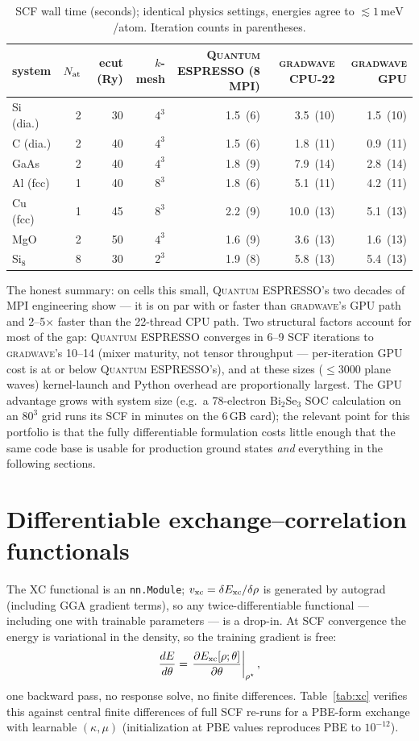 \documentclass[11pt]{article}
\newcommand{\gw}{\textsc{gradwave}}
\newcommand{\qe}{\textsc{Quantum ESPRESSO}}
\newcommand{\meV}{\,\mathrm{meV}}
\begin{document}
\begin{table}[h]\centering
\caption{SCF wall time (seconds); identical physics settings, energies agree
to $\lesssim 1\meV$/atom. Iteration counts in parentheses.}
\begin{tabular}{lrrrrrr}
\toprule
system & $N_{\rm at}$ & ecut (Ry) & $k$-mesh & \qe{} (8 MPI) & \gw{} CPU-22 & \gw{} GPU \\
\midrule
Si (dia.)   & 2 & 30 & $4^3$ & 1.5 \,(6) & 3.5 \,(10) & 1.5 \,(10) \\
C (dia.)    & 2 & 40 & $4^3$ & 1.5 \,(6) & 1.8 \,(11) & 0.9 \,(11) \\
GaAs        & 2 & 40 & $4^3$ & 1.8 \,(9) & 7.9 \,(14) & 2.8 \,(14) \\
Al (fcc)    & 1 & 40 & $8^3$ & 1.8 \,(6) & 5.1 \,(11) & 4.2 \,(11) \\
Cu (fcc)    & 1 & 45 & $8^3$ & 2.2 \,(9) & 10.0 \,(13) & 5.1 \,(13) \\
MgO         & 2 & 50 & $4^3$ & 1.6 \,(9) & 3.6 \,(13) & 1.6 \,(13) \\
Si$_8$      & 8 & 30 & $2^3$ & 1.9 \,(8) & 5.8 \,(13) & 5.4 \,(13) \\
\bottomrule
\end{tabular}
\end{table}

The honest summary: on cells this small, \qe{}'s two decades of MPI
engineering show --- it is on par with or faster than \gw{}'s GPU path and
2--5$\times$ faster than the 22-thread CPU path. Two structural factors
account for most of the gap: \qe{} converges in 6--9 SCF iterations to
\gw's 10--14 (mixer maturity, not tensor throughput --- per-iteration GPU
cost is at or below \qe's), and at these sizes ($\leq 3000$ plane waves)
kernel-launch and Python overhead are proportionally largest. The GPU
advantage grows with system size (e.g.\ a 78-electron Bi$_2$Se$_3$ SOC
calculation on an $80^3$ grid runs its SCF in minutes on the 6\,GB card);
the relevant point for this portfolio is that the fully differentiable
formulation costs little enough that the same code base is usable for
production ground states \emph{and} everything in the following sections.

\section{Differentiable exchange--correlation functionals}
\label{sec:xc}

The XC functional is an \texttt{nn.Module}; $v_{\rm xc} = \delta E_{\rm
xc}/\delta\rho$ is generated by autograd (including GGA gradient terms), so
any twice-differentiable functional --- including one with trainable
parameters --- is a drop-in. At SCF convergence the energy is variational in
the density, so the training gradient is free:
\begin{equation}
\frac{dE}{d\theta} = \left.\frac{\partial E_{\rm xc}[\rho;\theta]}
{\partial\theta}\right|_{\rho^\star} ,
\end{equation}
one backward pass, no response solve, no finite differences.
Table~\ref{tab:xc} verifies this against central finite differences of full
SCF re-runs for a PBE-form exchange with learnable $(\kappa,\mu)$
(initialization at PBE values reproduces PBE to $10^{-12}$).
\end{document}

